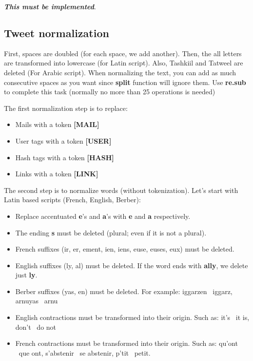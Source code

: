 \documentclass[11pt, a4paper]{article}
\begin{document}
\textbf{\slshape This must be implemented}.

\subsection{Tweet normalization}

First, spaces are doubled (for each space, we add another).
Then, the all letters are transformed into lowercase (for Latin script).
Also, Tashkiil and Tatweel are deleted (For Arabic script).
When normalizing the text, you can add as much consecutive spaces as you want since \textbf{split} function will ignore them.
Use \textbf{re.sub} to complete this task (normally no more than 25 operations is needed)

The first normalization step is to replace:
\begin{itemize}
	\item Mails with a token \textbf{[MAIL]}
	\item User tags with a token \textbf{[USER]}
	\item Hash tags with a token \textbf{[HASH]}
	\item Links with a token \textbf{[LINK]}
\end{itemize}

The second step is to normalize words (without tokenization). 
Let's start with Latin based scripts (French, English, Berber):
\begin{itemize}
	\item Replace accentuated \textbf{e}'s and \textbf{a}'s with \textbf{e} and \textbf{a} respectively.
	\item The ending \textbf{s} must be deleted (plural; even if it is not a plural).
	\item French suffixes (ir, er, ement, ien, iens, euse, euses, eux) must be deleted.
	\item English suffixes (ly, al) must be deleted. If the word ends with \textbf{ally}, we delete just \textbf{ly}.
	\item Berber suffixes (yas, en) must be deleted. For example: iggarzen \textrightarrow\ iggarz, arnuyas \textrightarrow\ arnu
	\item English contractions must be transformed into their origin. Such as: it's \textrightarrow\ it is, don't \textrightarrow\ do not
	\item French contractions must be transformed into their origin. Such as: qu'ont \textrightarrow\ que ont, s'abstenir \textrightarrow\ se abstenir, p'tit \textrightarrow\ petit.
\end{itemize}
\end{document}
